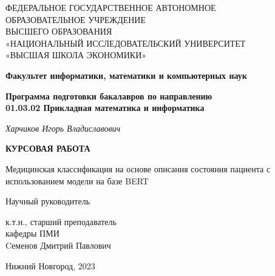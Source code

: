 \thispagestyle{empty}

\begin{center}
    ФЕДЕРАЛЬНОЕ ГОСУДАРСТВЕННОЕ АВТОНОМНОЕ\\
    ОБРАЗОВАТЕЛЬНОЕ УЧРЕЖДЕНИЕ\\
    ВЫСШЕГО ОБРАЗОВАНИЯ\\
    «НАЦИОНАЛЬНЫЙ ИССЛЕДОВАТЕЛЬСКИЙ УНИВЕРСИТЕТ\\
    «ВЫСШАЯ ШКОЛА ЭКОНОМИКИ»
\end{center}

\vfill

\begin{center}
    \textbf{Факультет информатики, математики и компьютерных наук}

    \vspace{20pt}

    \textbf{Программа подготовки бакалавров по направлению \\
    01.03.02 Прикладная математика и информатика}
\end{center}

\vfill

\begin{center}
    \textit{Харчиков Игорь Владиславович} 
    
    \vspace{20pt}
    
    \textbf{КУРСОВАЯ РАБОТА}

    \vspace{20pt}
    
    Медицинская классификация на основе описания состояния пациента с использованием модели на базе BERT
\end{center}

\vfill

\begin{flushright}
Научный руководитель

\vspace{5pt}

к.т.н., старший преподаватель 
\\
кафедры ПМИ
\\
Cеменов Дмитрий Павлович
\end{flushright}

\vfill

\begin{center}
    Нижний Новгород, 2023
\end{center}